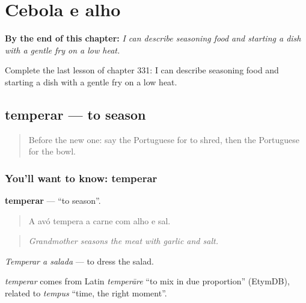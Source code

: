 
\chapter{Cebola e alho}
\label{ch:pt-cebola-e-alho}

\begin{chapteropening}
\textbf{By the end of this chapter:} \emph{I can describe seasoning food and starting a dish with a gentle fry on a low heat.}

Complete the last lesson of chapter 331: I can describe seasoning food and starting a dish with a gentle fry on a low heat.
\end{chapteropening}

\section[temperar]{temperar — to season}

\label{lesson:PT-C331-temperar}



\begin{quote}
Before the new one: say the Portuguese for to shred, then the Portuguese for the bowl.
\end{quote}

\subsection*{You'll want to know: temperar}
\textbf{temperar} — \textquotedblleft{}to season\textquotedblright{}.

\begin{quote}
A avó tempera a carne com alho e sal.
\end{quote}

\begin{quote}
\emph{Grandmother seasons the meat with garlic and salt.}
\end{quote}

\emph{Temperar a salada} — to dress the salad.

\begin{cousinweb}
\emph{temperar} comes from Latin \emph{temperāre} \textquotedblleft{}to mix in due proportion\textquotedblright{} (EtymDB), related to \emph{tempus} \textquotedblleft{}time, the right moment\textquotedblright{}.
\end{cousinweb}

